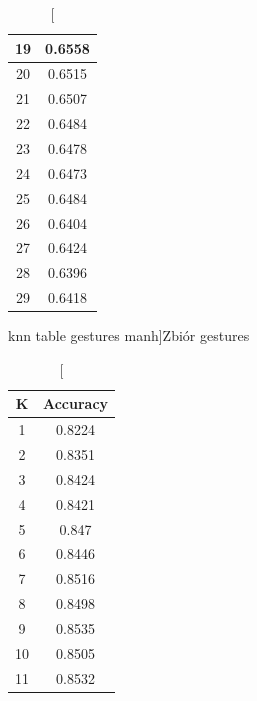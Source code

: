 \documentclass{classrep}
\begin{document}
{{{\begin{table}[!htbp]
\begin{minipage}{.3\textwidth}
\begin{tabular}{|c|c|}
                            19 & 0.6558 \\ \hline
                            20 & 0.6515 \\ \hline
                            21 & 0.6507 \\ \hline
                            22 & 0.6484 \\ \hline
                            23 & 0.6478 \\ \hline
                            24 & 0.6473 \\ \hline
                            25 & 0.6484 \\ \hline
                            26 & 0.6404 \\ \hline
                            27 & 0.6424 \\ \hline
                            28 & 0.6396 \\ \hline
                            29 & 0.6418 \\ \hline
                        \end{tabular}
                        \caption
                        [knn table gestures manh]{Zbiór gestures}
                        \label{knn_table_gestures_manh}
                    \end{minipage}
                    \hfill
                    \begin{minipage}{.3\textwidth}
                        \centering
                        \begin{tabular}{|c|c|}
                            \hline
                            K & Accuracy \\ \hline
                            1 & 0.8224 \\ \hline
                            2 & 0.8351 \\ \hline
                            3 & 0.8424 \\ \hline
                            4 & 0.8421 \\ \hline
                            5 & 0.847 \\ \hline
                            6 & 0.8446 \\ \hline
                            7 & 0.8516 \\ \hline
                            8 & 0.8498 \\ \hline
                            9 & 0.8535 \\ \hline
                            10 & 0.8505 \\ \hline
                            11 & 0.8532 \\ \hline

\end{tabular}
\end{minipage}
\end{table}}}}
\end{document}
